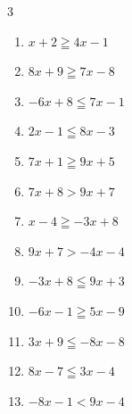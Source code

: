\begin{multicols}{3}
\begin{enumerate}

  \item $x+2\geqq 4x-1$

        \phantom{$\displaystyle x\leqq 1$}

  \item $8x+9\geqq 7x-8$

        \phantom{$\displaystyle x\geqq -17$}

  \item $-6x+8\leqq 7x-1$


  \item $2x-1\leqq 8x-3$


  \item $7x+1\geqq 9x+5$

        \phantom{$\displaystyle x\leqq -2$}

  \item $7x+8>9x+7$


  \item $x-4\geqq -3x+8$

        \phantom{$\displaystyle x\geqq 3$}

  \item $9x+7>-4x-4$


\columnbreak %

\resetques

  \item $-3x+8\leqq 9x+3$


  \item $-6x-1\geqq 5x-9$


  \item $3x+9\leqq -8x-8$


  \item $8x-7\leqq 3x-4$


  \item $-8x-1<9x-4$


\end{enumerate}
\end{multicols}
